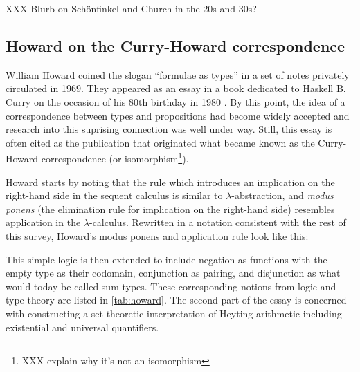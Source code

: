 \documentclass[12pt,toc=bibliography,numbers=noendperiod,
               footnotes=multiple,twoside]{scrartcl}
\begin{document}
XXX Blurb on Schönfinkel and Church in the 20s and 30s?

\subsection{Howard on the Curry-Howard correspondence}

William Howard coined the slogan \enquote{formulae as types} in a set of notes privately circulated in 1969. They appeared as an essay in a book dedicated to Haskell B. Curry on the occasion of his 80th birthday in 1980 \autocite{howard_formulae-as-types_1980}. By this point, the idea of a correspondence between types and propositions had become widely accepted and research into this suprising connection was well under way. Still, this essay is often cited as the publication that originated what became known as the Curry-Howard correspondence (or isomorphism\footnote{XXX explain why it's not an isomorphism}).

Howard starts by noting that the rule which introduces an implication on the right-hand side in the sequent calculus is similar to \(\lambda\)-abstraction, and \emph{modus ponens} (the elimination rule for implication on the right-hand side) resembles application in the \(\lambda\)-calculus. Rewritten in a notation consistent with the rest of this survey, Howard's modus ponens and application rule look like this:

\begin{figure}[h]
\begin{minipage}[b]{1\linewidth}
\centering
\begin{minipage}[b]{0.4\linewidth}
\begin{prooftree}
\end{prooftree}
\end{minipage}
\begin{minipage}[b]{0.4\linewidth}
\begin{prooftree}
\end{prooftree}
\end{minipage}
\end{minipage}
\end{figure}


This simple
logic is then extended to include negation as functions with the empty type as their codomain, conjunction as pairing, and disjunction as what would today be called sum types. These corresponding notions from logic and type theory are listed in \cref{tab:howard}. The second part of the essay is concerned with constructing a set-theoretic interpretation of Heyting arithmetic including existential and universal quantifiers.
\end{document}
